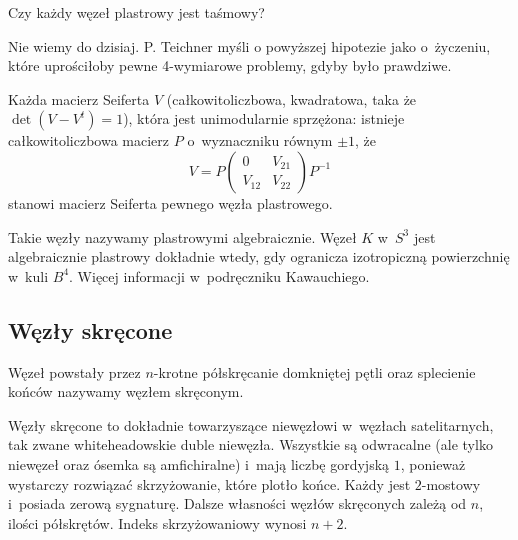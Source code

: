 \begin{conjecture}[Fox, 1958]
    Czy każdy węzeł plastrowy jest taśmowy?
\end{conjecture}

Nie wiemy do dzisiaj.
P. Teichner myśli o powyższej hipotezie jako o~życzeniu, które uprościłoby pewne 4-wymiarowe problemy, gdyby było prawdziwe.

\begin{proposition}
    Każda macierz Seiferta $V$ (całkowitoliczbowa, kwadratowa, taka że $\det (V - V^t) = 1$), która jest unimodularnie sprzężona: istnieje całkowitoliczbowa macierz $P$ o~wyznaczniku równym $\pm 1$, że
    \begin{equation}
        V = P \begin{pmatrix} 0 & V_{21} \\ V_{12} & V_{22} \end{pmatrix} P^{-1}
    \end{equation}
    stanowi macierz Seiferta pewnego węzła plastrowego.
\end{proposition}

Takie węzły nazywamy plastrowymi algebraicznie.
Węzeł $K$ w~$S^3$ jest algebraicznie plastrowy dokładnie wtedy, gdy ogranicza izotropiczną powierzchnię w~kuli $B^4$.
Więcej informacji w~podręczniku Kawauchiego.


\subsection{Węzły skręcone}
\begin{definition} \label{twist_knots}
    Węzeł powstały przez $n$-krotne półskręcanie domkniętej pętli oraz splecienie końców nazywamy węzłem skręconym.
\end{definition}

Węzły skręcone to dokładnie towarzyszące niewęzłowi w~węzłach satelitarnych, tak zwane whiteheadowskie duble niewęzła.
Wszystkie są odwracalne (ale tylko niewęzeł oraz ósemka są amfichiralne) i~mają liczbę gordyjską $1$, ponieważ wystarczy rozwiązać skrzyżowanie, które plotło końce.
Każdy jest $2$-mostowy i~posiada zerową sygnaturę.
Dalsze własności węzłów skręconych zależą od $n$, ilości półskrętów.
Indeks skrzyżowaniowy wynosi $n + 2$.

